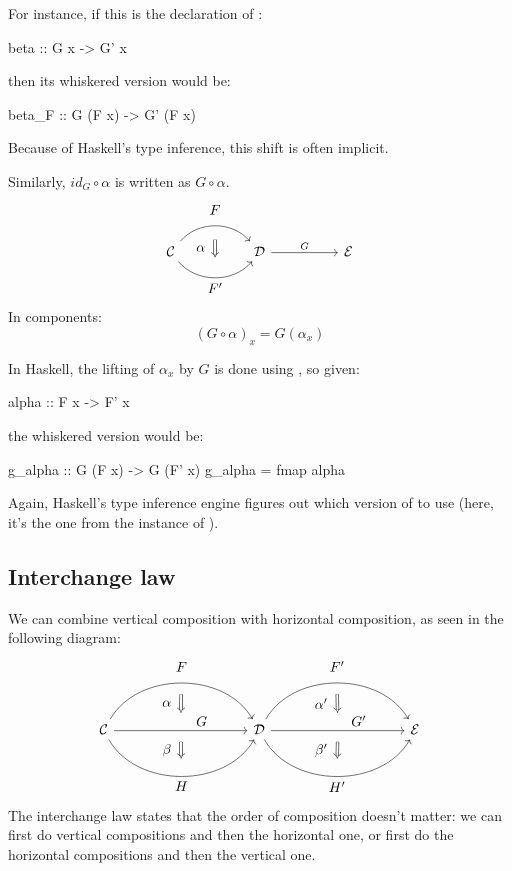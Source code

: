 \documentclass[DaoFP]{subfiles}
\begin{document}
For instance, if this is the declaration of :
\begin{haskell}
beta :: G x -> G' x
\end{haskell}
then its whiskered version would be:
\begin{haskell}
beta_F :: G (F x) -> G' (F x)
\end{haskell}
Because of Haskell's type inference, this shift is often implicit.

Similarly, $id_G \circ \alpha$ is written as $G \circ \alpha$.
\[
\begin{tikzcd}[column sep=huge]
\mathcal{C}
  \arrow[bend left=50]{r}[name=U, label=above:$F$]{}
  \arrow[bend right=50]{r}[name=D, label=below:$F'$]{} 
 &
\mathcal{D}
\arrow[r, "G"]
&
\mathcal{E}
  \arrow[shorten <=10pt,shorten >=10pt,Rightarrow,to path={(U) -- node[label=left:$\alpha$] {} (D)}]{}
\end{tikzcd}
\]
In components:
\[(G \circ \alpha)_x = G (\alpha_x) \]

In Haskell, the lifting of $\alpha_x$ by $G$ is done using , so given:
\begin{haskell}
alpha :: F x -> F' x
\end{haskell}
the whiskered version would be:
\begin{haskell}
g_alpha :: G (F x) -> G (F' x)
g_alpha = fmap alpha
\end{haskell}
Again, Haskell's type inference engine figures out which version of  to use (here, it's the one from the  instance of ).

\subsection{Interchange law}
We can combine vertical composition with horizontal composition, as seen in the following diagram:
\[
\begin{tikzcd}[column sep=huge]
\mathcal{C}
  \arrow[bend left=60]{rr}[name=U, label=above:$F$]{}
  \arrow[]{rr}[name=M, label={[xshift=15pt, yshift=-5pt]:$G$}]{} 
  \arrow[bend right=60]{rr}[name=D, label=below:$H$]{} 
 &&
\mathcal{D}
  \arrow[bend left=60]{rr}[name=U1, label=above:$F'$]{}
  \arrow[]{rr}[name=M1, label={[xshift=15pt, yshift=-5pt]:$G'$}]{} 
  \arrow[bend right=60]{rr}[name=D1, label=below:$H'$]{} 
&&
\mathcal{E}
  \arrow[shorten <=8pt, shorten >=8pt,Rightarrow, to path={(U) -- node[label=left:$\alpha$] {} (M)}]{}
  \arrow[shorten <=8pt, shorten >=8pt,Rightarrow, to path={(M) -- node[label=left:$\beta$] {} (D)}]{}
  \arrow[shorten <=8pt, shorten >=8pt,Rightarrow, to path={(U1) -- node[label=left:$\alpha'$] {} (M1)}]{}
  \arrow[shorten <=8pt, shorten >=8pt,Rightarrow, to path={(M1) -- node[label=left:$\beta'$] {} (D1)}]{}
\end{tikzcd}
\]
The interchange law states that the order of composition doesn't matter: we can first do vertical compositions and then the horizontal one, or first do the horizontal compositions and then the vertical one.
\end{document}
